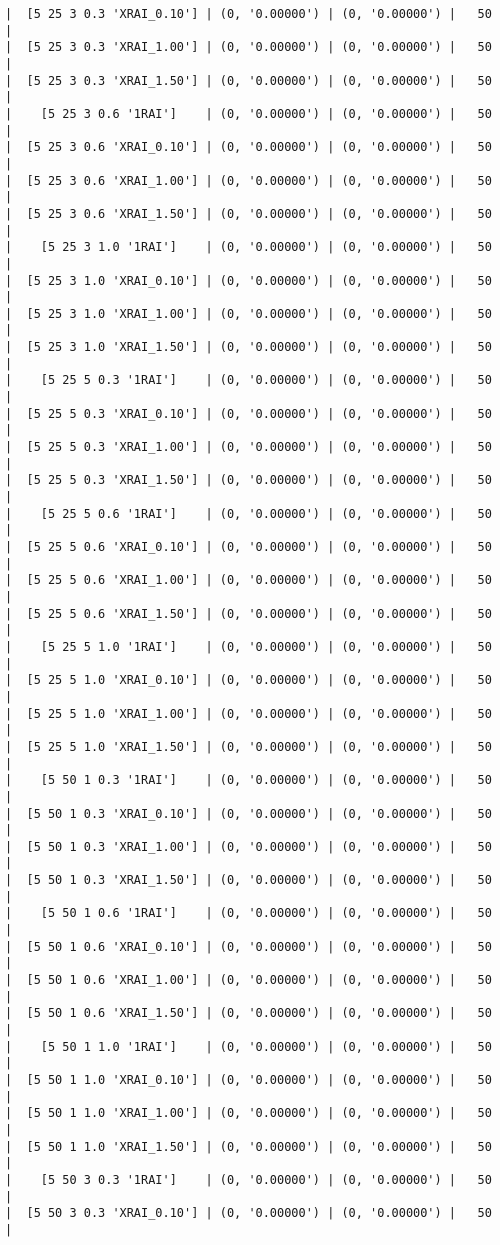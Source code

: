 \documentclass{article}
\begin{document}
\begin{verbatim}
|  [5 25 3 0.3 'XRAI_0.10'] | (0, '0.00000') | (0, '0.00000') |   50  |
|  [5 25 3 0.3 'XRAI_1.00'] | (0, '0.00000') | (0, '0.00000') |   50  |
|  [5 25 3 0.3 'XRAI_1.50'] | (0, '0.00000') | (0, '0.00000') |   50  |
|    [5 25 3 0.6 '1RAI']    | (0, '0.00000') | (0, '0.00000') |   50  |
|  [5 25 3 0.6 'XRAI_0.10'] | (0, '0.00000') | (0, '0.00000') |   50  |
|  [5 25 3 0.6 'XRAI_1.00'] | (0, '0.00000') | (0, '0.00000') |   50  |
|  [5 25 3 0.6 'XRAI_1.50'] | (0, '0.00000') | (0, '0.00000') |   50  |
|    [5 25 3 1.0 '1RAI']    | (0, '0.00000') | (0, '0.00000') |   50  |
|  [5 25 3 1.0 'XRAI_0.10'] | (0, '0.00000') | (0, '0.00000') |   50  |
|  [5 25 3 1.0 'XRAI_1.00'] | (0, '0.00000') | (0, '0.00000') |   50  |
|  [5 25 3 1.0 'XRAI_1.50'] | (0, '0.00000') | (0, '0.00000') |   50  |
|    [5 25 5 0.3 '1RAI']    | (0, '0.00000') | (0, '0.00000') |   50  |
|  [5 25 5 0.3 'XRAI_0.10'] | (0, '0.00000') | (0, '0.00000') |   50  |
|  [5 25 5 0.3 'XRAI_1.00'] | (0, '0.00000') | (0, '0.00000') |   50  |
|  [5 25 5 0.3 'XRAI_1.50'] | (0, '0.00000') | (0, '0.00000') |   50  |
|    [5 25 5 0.6 '1RAI']    | (0, '0.00000') | (0, '0.00000') |   50  |
|  [5 25 5 0.6 'XRAI_0.10'] | (0, '0.00000') | (0, '0.00000') |   50  |
|  [5 25 5 0.6 'XRAI_1.00'] | (0, '0.00000') | (0, '0.00000') |   50  |
|  [5 25 5 0.6 'XRAI_1.50'] | (0, '0.00000') | (0, '0.00000') |   50  |
|    [5 25 5 1.0 '1RAI']    | (0, '0.00000') | (0, '0.00000') |   50  |
|  [5 25 5 1.0 'XRAI_0.10'] | (0, '0.00000') | (0, '0.00000') |   50  |
|  [5 25 5 1.0 'XRAI_1.00'] | (0, '0.00000') | (0, '0.00000') |   50  |
|  [5 25 5 1.0 'XRAI_1.50'] | (0, '0.00000') | (0, '0.00000') |   50  |
|    [5 50 1 0.3 '1RAI']    | (0, '0.00000') | (0, '0.00000') |   50  |
|  [5 50 1 0.3 'XRAI_0.10'] | (0, '0.00000') | (0, '0.00000') |   50  |
|  [5 50 1 0.3 'XRAI_1.00'] | (0, '0.00000') | (0, '0.00000') |   50  |
|  [5 50 1 0.3 'XRAI_1.50'] | (0, '0.00000') | (0, '0.00000') |   50  |
|    [5 50 1 0.6 '1RAI']    | (0, '0.00000') | (0, '0.00000') |   50  |
|  [5 50 1 0.6 'XRAI_0.10'] | (0, '0.00000') | (0, '0.00000') |   50  |
|  [5 50 1 0.6 'XRAI_1.00'] | (0, '0.00000') | (0, '0.00000') |   50  |
|  [5 50 1 0.6 'XRAI_1.50'] | (0, '0.00000') | (0, '0.00000') |   50  |
|    [5 50 1 1.0 '1RAI']    | (0, '0.00000') | (0, '0.00000') |   50  |
|  [5 50 1 1.0 'XRAI_0.10'] | (0, '0.00000') | (0, '0.00000') |   50  |
|  [5 50 1 1.0 'XRAI_1.00'] | (0, '0.00000') | (0, '0.00000') |   50  |
|  [5 50 1 1.0 'XRAI_1.50'] | (0, '0.00000') | (0, '0.00000') |   50  |
|    [5 50 3 0.3 '1RAI']    | (0, '0.00000') | (0, '0.00000') |   50  |
|  [5 50 3 0.3 'XRAI_0.10'] | (0, '0.00000') | (0, '0.00000') |   50  |

\end{verbatim}
\end{document}
